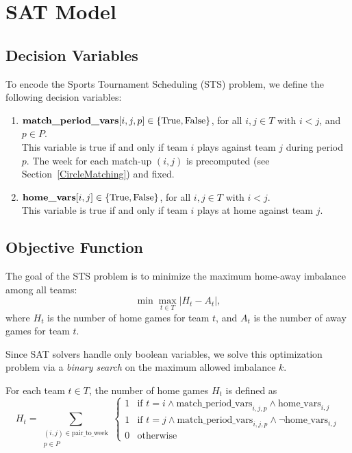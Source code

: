\section{SAT Model}

\subsection{Decision Variables}
To encode the Sports Tournament Scheduling (STS) problem, we define the following decision variables:
\begin{enumerate}
    \item $\text{\textbf{match\_period\_vars}}[i,j,p] \in \{\mathrm{True}, \mathrm{False}\}$, for all $i,j \in T$ with $i < j$, and $p \in P$. \\
    This variable is true if and only if team $i$ plays against team $j$ during period $p$. The week for each match-up $(i,j)$ is precomputed (see Section~\ref{CircleMatching}) and fixed.
    
    \item $\text{\textbf{home\_vars}}[i,j] \in \{\mathrm{True}, \mathrm{False}\}$, for all $i,j \in T$ with $i < j$. \\
    This variable is true if and only if team $i$ plays at home against team $j$.
\end{enumerate}

\subsection{Objective Function}
The goal of the STS problem is to minimize the maximum home-away imbalance among all teams:
\[
\min \max_{t \in T} |H_t - A_t|,
\]
where $H_t$ is the number of home games for team $t$, and $A_t$ is the number of away games for team $t$.

Since SAT solvers handle only boolean variables, we solve this optimization problem via a \emph{binary search} on the maximum allowed imbalance $k$.

For each team $t \in T$, the number of home games $H_t$ is defined as
\[
H_t = \sum_{\substack{(i,j) \in \text{pair\_to\_week} \\ p \in P}}
\begin{cases}
1 & \text{if } t = i \land \text{match\_period\_vars}_{i,j,p} \land \text{home\_vars}_{i,j} \\
1 & \text{if } t = j \land \text{match\_period\_vars}_{i,j,p} \land \neg \text{home\_vars}_{i,j} \\
0 & \text{otherwise}
\end{cases}
\]

